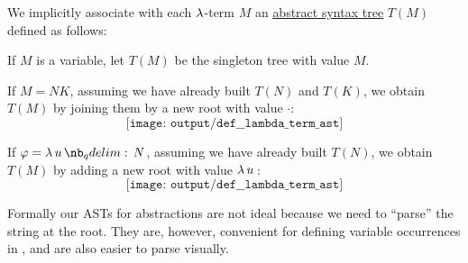 \begin{definition}\label{def:untyped_lambda_term_ast}
  We implicitly associate with each \( \mathrm{\lambda} \)-term \( M \) an \hyperref[con:abstract_syntax_tree]{abstract syntax tree} \( T(M) \) defined as follows:
  \begin{thmenum}
     If \( M \) is a variable, let \( T(M) \) be the singleton tree with value \( M \).

     If \( M = NK \), assuming we have already built \( T(N) \) and \( T(K) \), we obtain \( T(M) \) by joining them by a new root with value \( \cdot \):
    \begin{equation*}
      \texttt{[image: output/def\_\_lambda\_term\_ast]}
    \end{equation*}

     If \( \varphi = \qabs u N \), assuming we have already built \( T(N) \), we obtain \( T(M) \) by adding a new root with value \( \qabs* u \):
    \begin{equation*}
      \texttt{[image: output/def\_\_lambda\_term\_ast]}
    \end{equation*}
  \end{thmenum}
\end{definition}
\begin{comments}
  \item Formally our ASTs for abstractions are not ideal because we need to \enquote{parse} the string at the root. They are, however, convenient for defining variable occurrences in , and are also easier to parse visually.
\end{comments}


